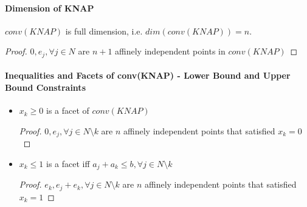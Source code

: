             \paragraph{Dimension of KNAP}
                $conv(KNAP)$ is full dimension, i.e. $dim(conv(KNAP))=n$.\\
                \begin{proof}
                    $0, e_j, \forall j\in N$ are $n + 1$ affinely independent points in $conv(KNAP)$
                \end{proof}

            \paragraph{Inequalities and Facets of conv(KNAP) - Lower Bound and Upper Bound Constraints}
                \begin{itemize}
                    \item $x_k\ge 0$ is a facet of $conv(KNAP)$
                    \begin{proof}
                        $0, e_j, \forall j\in N\setminus k$ are $n$ affinely independent points that satisfied $x_k=0$
                    \end{proof}
                    \item $x_k\le 1$ is a facet iff $a_j + a_k \le b, \forall j\in N \setminus k$
                    \begin{proof}
                        $e_k, e_j+e_k, \forall j \in N\setminus k$ are $n$ affinely independent points that satisfied $x_k = 1$
                    \end{proof}
                \end{itemize}                

